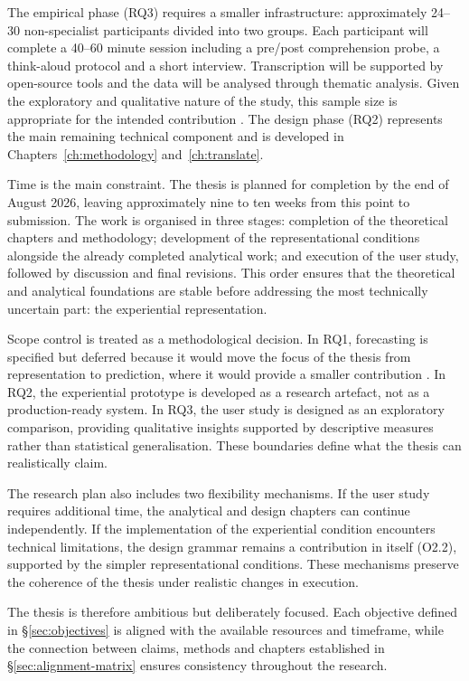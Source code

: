 The empirical phase (RQ3) requires a smaller infrastructure: approximately 24--30 non-specialist participants divided into two groups. Each participant will complete a 40--60 minute session including a pre/post comprehension probe, a think-aloud protocol and a short interview. Transcription will be supported by open-source tools and the data will be analysed through thematic analysis. Given the exploratory and qualitative nature of the study, this sample size is appropriate for the intended contribution \citep{braunclarke2006, smithmcgannon2018}. The design phase (RQ2) represents the main remaining technical component and is developed in Chapters~\ref{ch:methodology} and~\ref{ch:translate}.

Time is the main constraint. The thesis is planned for completion by the end of August 2026, leaving approximately nine to ten weeks from this point to submission. The work is organised in three stages: completion of the theoretical chapters and methodology; development of the representational conditions alongside the already completed analytical work; and execution of the user study, followed by discussion and final revisions. This order ensures that the theoretical and analytical foundations are stable before addressing the most technically uncertain part: the experiential representation.

Scope control is treated as a methodological decision. In RQ1, forecasting is specified but deferred because it would move the focus of the thesis from representation to prediction, where it would provide a smaller contribution \citep{sonnewald2021}. In RQ2, the experiential prototype is developed as a research artefact, not as a production-ready system. In RQ3, the user study is designed as an exploratory comparison, providing qualitative insights supported by descriptive measures rather than statistical generalisation. These boundaries define what the thesis can realistically claim.

The research plan also includes two flexibility mechanisms. If the user study requires additional time, the analytical and design chapters can continue independently. If the implementation of the experiential condition encounters technical limitations, the design grammar remains a contribution in itself (O2.2), supported by the simpler representational conditions. These mechanisms preserve the coherence of the thesis under realistic changes in execution.

The thesis is therefore ambitious but deliberately focused. Each objective defined in \S\ref{sec:objectives} is aligned with the available resources and timeframe, while the connection between claims, methods and chapters established in \S\ref{sec:alignment-matrix} ensures consistency throughout the research.
